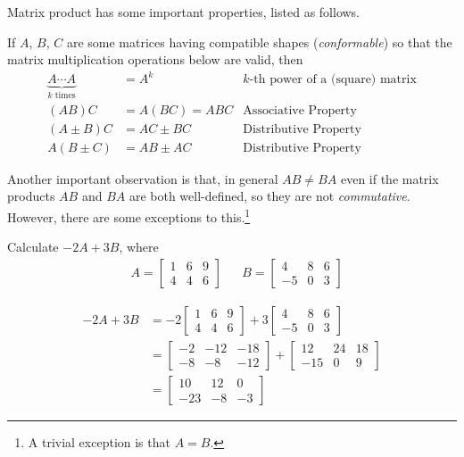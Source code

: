 Matrix product has some important properties, listed as follows.
\begin{proper}
\label{proper:matmul}
If $A$, $B$, $C$ are some matrices having compatible shapes (\textit{conformable}) so that the matrix multiplication operations below are valid, then
\begin{align*}
\underbrace{A\cdots A}_{k \text{ times}} &= A^k &\text{$k$-th power of a (square) matrix} \\
(AB)C &= A(BC) = ABC &\text{Associative Property} \\
(A \pm B)C &= AC \pm BC &\text{Distributive Property} \\
A(B \pm C) &= AB \pm AC &\text{Distributive Property}
\end{align*}
\end{proper}
Another important observation is that, in general $AB \neq BA$ even if the matrix products $AB$ and $BA$ are both well-defined, so they are not \textit{commutative}. However, there are some exceptions to this.\footnote{A trivial exception is that $A=B$.}
\begin{exmp}
Calculate $-2A + 3B$, where
\begin{align*}
& A = 
\begin{bmatrix}
1 & 6 & 9 \\
4 & 4 & 6 
\end{bmatrix} &
& B = 
\begin{bmatrix}
4 & 8 & 6 \\
-5 & 0 & 3
\end{bmatrix}
\end{align*}
\end{exmp}
\begin{solution}
\begin{align*}
-2A + 3B &= 
-2\begin{bmatrix}
1 & 6 & 9 \\
4 & 4 & 6 
\end{bmatrix}
+3\begin{bmatrix}
4 & 8 & 6 \\
-5 & 0 & 3
\end{bmatrix} \\
&= \begin{bmatrix}
-2 & -12 & -18 \\
-8 & -8 & -12 
\end{bmatrix}
+ \begin{bmatrix}
12 & 24 & 18 \\
-15 & 0 & 9
\end{bmatrix} \\
&= \begin{bmatrix}
10 & 12 & 0 \\
-23 & -8 & -3
\end{bmatrix}
\end{align*}
\end{solution}

